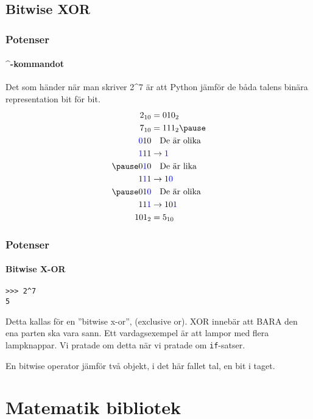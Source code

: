 \documentclass[aspectratio=169]{beamer}
\begin{document}
\subsection{Bitwise XOR}

\begin{frame}
	\frametitle{Potenser}
	\framesubtitle{\^{}-kommandot}
	Det som händer när man skriver 2\^{}7 är att Python jämför de båda talens binära representation bit för bit.
	\[ \begin{aligned}
		2_{10}  & = 010_2\\
		7_{10}  & = 111_2 \pause \\
		\textcolor{blue}{0}10 & \text{\hspace{1em}De är olika}\\
		\textcolor{blue}{1}11 & \rightarrow \textcolor{blue}{1}\\ \pause
		0\textcolor{blue}{1}0 & \text{\hspace{1em}De är lika}\\
		1\textcolor{blue}{1}1 & \rightarrow 1\textcolor{blue}{0} \\ \pause
		01\textcolor{blue}{0} & \text{\hspace{1em}De är olika}\\
		11\textcolor{blue}{1} & \rightarrow 10\textcolor{blue}{1} \\
		101_2 & =5_{10}
	\end{aligned} \]

\end{frame}


\begin{frame}[fragile]
	\frametitle{Potenser}
	\framesubtitle{Bitwise X-OR}
	
	\begin{lstlisting}
>>> 2^7
5
	\end{lstlisting}
	
	Detta kallas för en ''bitwise x-or'', (exclusive or). XOR innebär att BARA den ena parten ska vara sann. Ett vardagsexempel är att lampor med flera lampknappar. Vi pratade om detta när vi pratade om \texttt{if}-satser.
	
	En bitwise operator jämför två objekt, i det här fallet tal, en bit i taget.

\end{frame}

\section{Matematik bibliotek}
\end{document}
